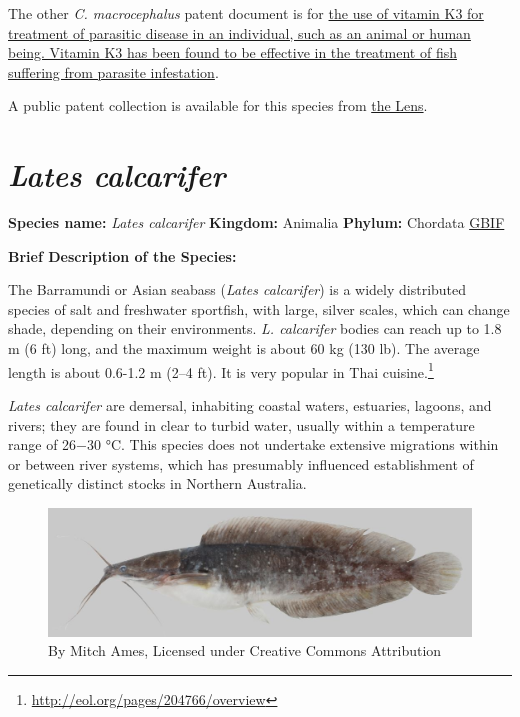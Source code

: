 \documentclass[]{book}
\theoremstyle{definition}
\theoremstyle{definition}
\theoremstyle{definition}
\theoremstyle{remark}
\begin{document}
The other \emph{C. macrocephalus} patent document is for
\href{https://www.lens.org/lens/patent/WO_2009_063044_A1}{the use of
vitamin K3 for treatment of parasitic disease in an individual, such as
an animal or human being. Vitamin K3 has been found to be effective in
the treatment of fish suffering from parasite infestation}.

A public patent collection is available for this species from
\href{https://www.lens.org/lens/collection/24937}{the Lens}.

\hypertarget{lates-calcarifer}{%
\section{\texorpdfstring{\emph{Lates
calcarifer}}{Lates calcarifer}}\label{lates-calcarifer}}

\textbf{Species name:} \emph{Lates calcarifer} \textbf{Kingdom:}
Animalia \textbf{Phylum:} Chordata
\href{https://www.gbif.org/species/2223871}{GBIF}

\textbf{Brief Description of the Species:}

The Barramundi or Asian seabass (\emph{Lates calcarifer}) is a widely
distributed species of salt and freshwater sportfish, with large, silver
scales, which can change shade, depending on their environments.
\emph{L. calcarifer} bodies can reach up to 1.8 m (6 ft) long, and the
maximum weight is about 60 kg (130 lb). The average length is about
0.6-1.2 m (2--4 ft). It is very popular in Thai cuisine.\footnote{\url{http://eol.org/pages/204766/overview}}

\emph{Lates calcarifer} are demersal, inhabiting coastal waters,
estuaries, lagoons, and rivers; they are found in clear to turbid water,
usually within a temperature range of 26−30 °C. This species does not
undertake extensive migrations within or between river systems, which
has presumably influenced establishment of genetically distinct stocks
in Northern Australia.

\begin{figure}
\centering
\includegraphics{images_species/152_Clarias_macrocephalus_CTU-P00116.jpg}
\caption{By Mitch Ames, Licensed under Creative Commons Attribution}
\end{figure}
\end{document}
